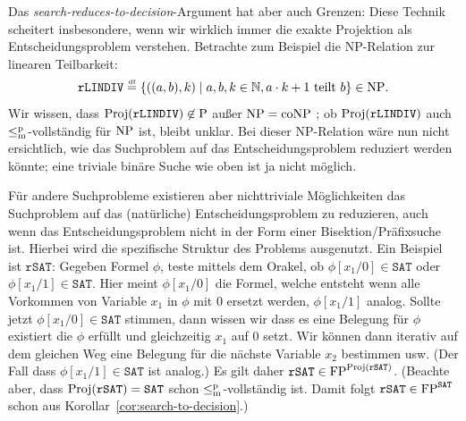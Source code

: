 



Das \emph{search-reduces-to-decision}-Argument hat aber auch Grenzen:
Diese Technik scheitert insbesondere, wenn wir wirklich immer die exakte Projektion als Entscheidungsproblem verstehen. Betrachte zum Beispiel die NP-Relation zur linearen Teilbarkeit:
\[ \mathtt{rLINDIV} \stackrel{\text{\smash{\tiny df}}}{=} \{ ((a, b), k) \mid a,b,k\in\mathbb N, a\cdot k + 1\text{ teilt } b\} \in\mathrm{NP}. \]
Wir wissen, dass $\operatorname{Proj}(\mathtt{rLINDIV})\not\in \mathrm{P}$ außer $\mathrm{NP}=\mathrm{coNP}$ \parencite{adleman_reducibility_1977}; ob $\operatorname{Proj}(\mathtt{rLINDIV})$ auch $\leq_\mathrm{m}^\mathrm{p}$-vollständig für $\mathrm{NP}$ ist, bleibt unklar.
Bei dieser NP-Relation wäre nun nicht ersichtlich, wie das Suchproblem auf das Entscheidungsproblem reduziert werden könnte; eine triviale binäre Suche wie oben ist ja nicht möglich.

Für andere Suchprobleme existieren aber nichttriviale Möglichkeiten  das Suchproblem auf das (natürliche) Entscheidungsproblem zu reduzieren, auch wenn das Entscheidungsproblem nicht in der Form einer Bisektion/Präfixsuche ist. Hierbei wird die spezifische Struktur des Problems ausgenutzt. Ein Beispiel ist $\mathtt{rSAT}$: Gegeben Formel $\phi$, teste mittels dem Orakel, ob $\phi[x_1/0]\in\mathtt{SAT}$ oder $\phi[x_1/1]\in\mathtt{SAT}$. Hier meint $\phi[x_1/0]$ die Formel, welche entsteht wenn alle Vorkommen von Variable $x_1$ in $\phi$ mit $0$ ersetzt werden, $\phi[x_1/1]$ analog. Sollte jetzt $\phi[x_1/0]\in\mathtt{SAT}$ stimmen, dann wissen wir dass es eine Belegung für $\phi$ existiert die $\phi$ erfüllt und gleichzeitig $x_1$ auf $0$ setzt. Wir können dann iterativ auf dem gleichen Weg eine Belegung für die nächste Variable $x_2$ bestimmen usw. (Der Fall dass $\phi[x_1/1]\in\mathtt{SAT}$ ist analog.) Es gilt daher $\mathtt{rSAT}\in\mathrm{FP}^{\operatorname{Proj}(\mathtt{rSAT})}$.
(Beachte aber, dass $\operatorname{Proj}(\mathtt{rSAT})=\mathtt{SAT}$ schon $\leq_\mathrm{m}^\mathrm{p}$-vollständig ist. Damit folgt $\mathtt{rSAT}\in \mathrm{FP}^{\mathtt{SAT}}$ schon aus Korollar~\ref{cor:search-to-decision}.)

